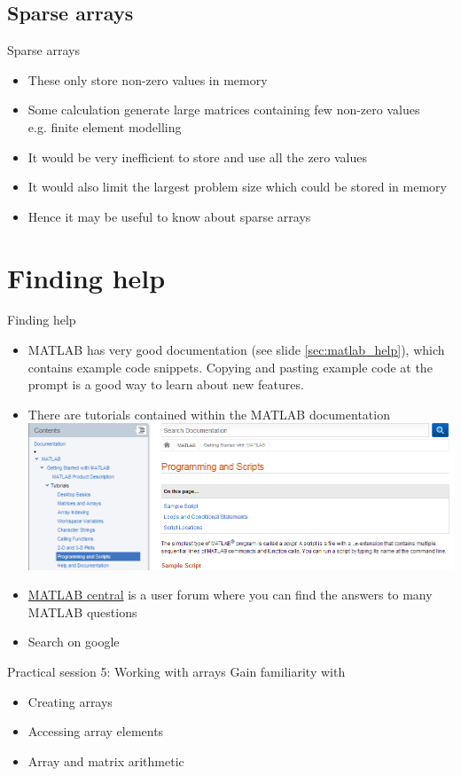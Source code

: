 \documentclass{beamer}
\begin{document}
\subsection{Sparse arrays}
\begin{frame}{Sparse arrays}{}
	\begin{itemize}
		\item These only store non-zero values in memory
		\item Some calculation generate large matrices containing few non-zero values\\
		e.g. finite element modelling
		\item It would be very inefficient to store and use all the zero values
		\item It would also limit the largest problem size which could be stored in memory
		\item Hence it may be useful to know about sparse arrays
	\end{itemize}
\end{frame}

\section{Finding help}
\begin{frame}{Finding help}
	\begin{itemize}
		\item MATLAB has very good documentation (see slide \ref{sec:matlab_help}), which contains  example code snippets. Copying and pasting example code at the prompt is a good way to learn about new features.
		\item There are tutorials contained within the MATLAB documentation\\		
		\includegraphics[width=\textwidth]{matlab_doc_tutorials}
		\item \href{http://uk.mathworks.com/matlabcentral/?s_tid=gn_mlc}{MATLAB central} is a user forum where you can find the answers to many MATLAB questions
		\item Search on google
	\end{itemize}
\end{frame}

\begin{frame}{Practical session 5: Working with arrays}
	Gain familiarity with \begin{itemize}
		\item Creating arrays
		\item Accessing array elements
		\item Array and matrix arithmetic
	\end{itemize}
\end{frame}
\end{document}
